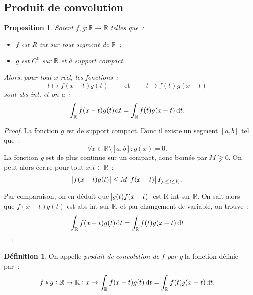 \documentclass{report}
\newtheorem{prp}[thm]{Proposition}
\theoremstyle{definition}
\newtheorem{déf}[thm]{Définition}
\theoremstyle{remark}
\numberwithin{equation}{section}
\newcommand{\R}{\mathbb R}
\begin{document}
		\subsection{Produit de convolution}
			\begin{prp} Soient $f, g : \R \to \R$ telles que~:
			\begin{itemize}
				\item $f$ est R-int sur tout segment de $\R$~;
				\item $g$ est $C^0$ sur $\R$ et à support compact.
			\end{itemize}

			Alors, pour tout $x$ réel, les fonctions~:
			\begin{equation}
				t \mapsto f(x-t)g(t)\qquad\text{ et }\qquad t \mapsto f(t)g(x-t)
			\end{equation}
			sont abs-int, et on a~:
			\begin{equation}
				\int_\R f(x-t)g(t)\dif t = \int_\R f(t)g(x-t)\dif t.
			\end{equation}
			\end{prp}

			\begin{proof} La fonction $g$ est de support compact. Donc il existe un segment $[a, b]$ tel que~:
			\begin{equation}
				\forall x \in \R \setminus [a, b] : g(x) = 0.
			\end{equation}
			La fonction $g$ est de plus continue sur un compact, donc bornée par $M \gneqq 0$. On peut alors écrire pour tout $x, t \in \R$~:
			\begin{equation}
				\abs {f(x-t)g(t)} \leq M\abs {f(x-t)}I_{\left[a \leq t \leq b\right]}.
			\end{equation}

			Par comparaison, on en déduit que $\abs {g(t)f(x-t)}$ est R-int sur $\R$. On sait alors que $f(x-t)g(t)$ est abs-int sur $\R$, et par changement de
			variable, on trouve~:
			\begin{equation}
				\int_\R f(x-t)g(t)\dif t = \int_\R f(t)g(x-t)\dif t
			\end{equation}

			\end{proof}

			\begin{déf} On appelle \textit{produit de convolution de $f$ par $g$} la fonction définie par~:
			\begin{equation}
				f * g : \R \to \R : x \mapsto \int_\R f(x-t)g(t)\dif t = \int_\R f(t)g(x-t)\dif t.
			\end{equation}
			\end{déf}
\end{document}
